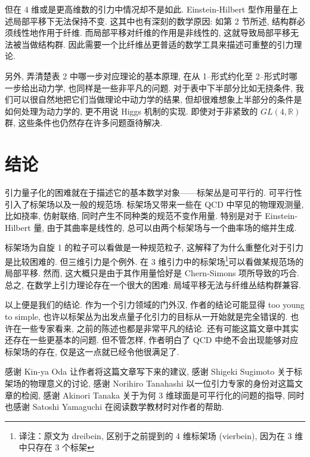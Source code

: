 \documentclass{article}
\begin{document}
但在 4 维或是更高维数的引力中情况却不是如此. Einstein-Hilbert 型作用量在上述局部平移下无法保持不变. 这其中也有深刻的数学原因: 如第 2 节所述, 结构群必须线性地作用于纤维. 而局部平移对纤维的作用是非线性的, 这就导致局部平移无法被当做结构群. 因此需要一个比纤维丛更普适的数学工具来描述可重整的引力理论.

另外, 弄清楚表 2 中哪一步对应理论的基本原理, 在从 1--形式约化至 2--形式时哪一步给出动力学, 也同样是一些非平凡的问题. 对于表中下半部分比如无挠条件, 我们可以很自然地把它们当做理论中动力学的结果, 但却很难想象上半部分的条件是如何处理为动力学的, 更不用说 Higgs 机制的实现. 即使对于非紧致的 $GL(4,\mathbb{R})$ 群, 这些条件也仍然存在许多问题亟待解决.
\section{结论}
引力量子化的困难就在于描述它的基本数学对象——标架丛是可平行的. 可平行性引入了标架场以及一般的规范场. 标架场又带来一些在 QCD 中罕见的物理观测量, 比如挠率, 仿射联络, 同时产生不同种类的规范不变作用量. 特别是对于 Einstein-Hilbert 量, 由于其曲率是线性的, 总可以由两个标架场与一个曲率场的缩并生成.

标架场为自旋 1 的粒子可以看做是一种规范粒子, 这解释了为什么重整化对于引力是比较困难的. 但三维引力是个例外. 在 3 维引力中的标架场\footnote{译注：原文为 dreibein, 区别于之前提到的 4 维标架场 (vierbein), 因为在 3 维中只存在 3 个标架}可以看做某规范场的局部平移. 然而, 这大概只是由于其作用量恰好是 Chern-Simons 项所导致的巧合. 总之, 在数学上引力理论存在一个很大的困难: 局域平移无法与纤维丛结构群兼容.

以上便是我们的结论. 作为一个引力领域的门外汉, 作者的结论可能显得 too young to simple, 也许以标架丛为出发点量子化引力的目标从一开始就是完全错误的. 也许在一些专家看来, 之前的陈述也都是非常平凡的结论. 还有可能这篇文章中其实还存在一些更基本的问题. 但不管怎样, 作者明白了 QCD 中绝不会出现能够对应标架场的存在, 仅是这一点就已经令他很满足了.

感谢 Kin-ya Oda 让作者将这篇文章写下来的建议, 感谢 Shigeki Sugimoto 关于标架场的物理意义的讨论, 感谢 Norihiro Tanahashi 以一位引力专家的身份对这篇文章的检阅, 感谢 Akinori Tanaka 关于为何 3 维球面是可平行化的问题的指导, 同时也感谢 Satoshi Yamaguchi 在阅读数学教材时对作者的帮助.
\end{document}
